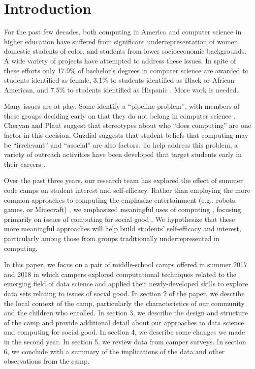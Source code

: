\section{Introduction}

For the past few decades, both computing in America and
computer science in higher education have suffered from significant
underrepresentation of women, domestic students of color, and
students from lower socioeconomic backgrounds.  A wide variety of
projects have attempted to address these issues.  In spite of these
efforts only 17.9\% of bachelor's degrees in computer science are
awarded to students identified as female, 3.1\% to students identified
as Black or African-American, and 7.5\% to students identified as
Hispanic \cite{Taulbee2016}.  More work is needed.

Many issues are at play.  Some identify
a ``pipeline problem'', with members of these groups deciding
early on that they do not belong in computer science \cite{Gurer2002}.
Cheryan and Plaut \cite{Cheryan2010} suggest that stereotypes about
who ``does computing'' are one factor in this decision.  Guzdial
\cite{Guzdial2009} suggests that student beliefs that computing may
be ``irrelevant'' and ``asocial'' are also factors.  To help address
this problem, a variety of outreach activities have been developed
that target students early in their careers \cite{McGill2015,Decker2016}.

Over the past three years, our research team has explored the effect
of summer code camps on student interest and self-efficacy.  Rather
than employing the more common approaches to computing the emphasize
entertainment (e.g., robots, games, or Minecraft) \cite{DeWitt2017},
we emphasized meaningful uses of computing
\cite{arts-coding,dssg-sigcse-2018}, focusing primarily on issues
of computing for social good \cite{Goldweber2013}.  We hypothesize
that these more meaningful approaches will help build students'
self-efficacy and interest, particularly among those from groups
traditionally underrepresented in computing.

In this paper, we focus on a pair of middle-school camps offered in summer 2017
and 2018 in which campers explored computational
techniques related to the emerging field of data science and applied
their newly-developed skills to explore data sets relating to issues
of social good.
In section 2 of the paper, we describe the local context of the
camp, particularly the characteristics of our community and the
children who enrolled.  In section 3, we describe the design and
structure of the camp and provide additional detail about our
approaches to data science and computing for social good.  In section
4, we describe some changes we made  in the second year.  In section
5, we review data from camper surveys.  In section 6, we
conclude with a summary of the implications of the data and other
observations from the camp.

